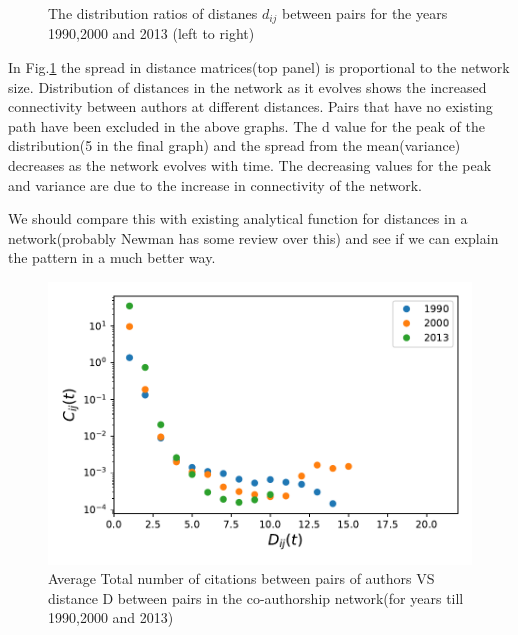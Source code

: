 \documentclass[aps, pre, twocolumn, nofootinbib]{revtex4-1}
\begin{document}
\begin{figure}[htbp]
  \captionsetup{singlelinecheck=false, justification=raggedright,  labelsep=space}
  \caption{The distribution ratios of distanes $d_{ij}$ between pairs for the years 1990,2000 and 2013 (left to right)}
  \label{f3}
\end{figure}
In Fig.\ref{f3} the spread in distance matrices(top panel) is proportional to the network size. Distribution of distances in the network as it  evolves shows the increased connectivity between authors at different distances. Pairs that have no existing path have been excluded in the above graphs. The d value for the peak of the distribution(5 in the final graph) and the spread from the mean(variance) decreases as the network evolves with time. The decreasing values for the peak and variance are due to the increase in connectivity of the network. 

{\color{blue}We should compare this with existing analytical function for distances in a network(probably Newman has some review over this) and see if we can explain the pattern in a much better way.}

\begin{figure}
	\centering
	
	\includegraphics[scale = 0.49]{plots/fig1}
	
\captionsetup{singlelinecheck=false, justification=raggedright,  labelsep=space}
\caption{Average Total number of citations between pairs of authors VS distance D between pairs in the co-authorship network(for years till 1990,2000 and 2013)}
   \label{f4}
\end{figure}
\end{document}
